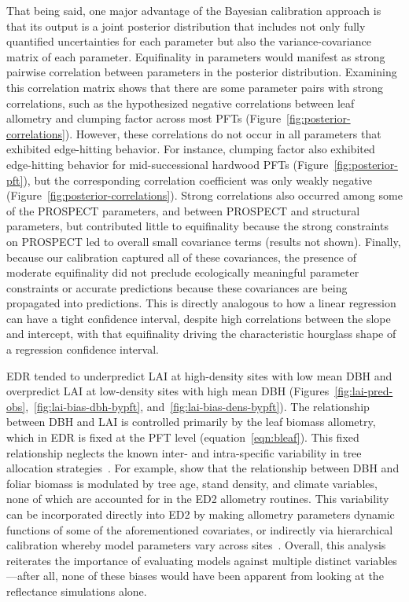 That being said, one major advantage of the Bayesian calibration approach is that its output is a joint posterior distribution that includes not only fully quantified uncertainties for each parameter but also the variance-covariance matrix of each parameter.
Equifinality in parameters would manifest as strong pairwise correlation between parameters in the posterior distribution.
Examining this correlation matrix shows that there are some parameter pairs with strong correlations, such as the hypothesized negative correlations between leaf allometry and clumping factor across most PFTs (Figure~\ref{fig:posterior-correlations}).
However, these correlations do not occur in all parameters that exhibited edge-hitting behavior.
For instance, clumping factor also exhibited edge-hitting behavior for mid-successional hardwood PFTs (Figure~\ref{fig:posterior-pft}), but the corresponding correlation coefficient was only weakly negative (Figure~\ref{fig:posterior-correlations}).
Strong correlations also occurred among some of the PROSPECT parameters, and between PROSPECT and structural parameters, but contributed little to equifinality because the strong constraints on PROSPECT led to overall small covariance terms (results not shown).
Finally, because our calibration captured all of these covariances, the presence of moderate equifinality did not preclude ecologically meaningful parameter constraints or accurate predictions because these covariances are being propagated into predictions.
This is directly analogous to how a linear regression can have a tight confidence interval, despite high correlations between the slope and intercept, with that equifinality driving the characteristic hourglass shape of a regression confidence interval.

EDR tended to underpredict LAI at high-density sites with low mean DBH and overpredict LAI at low-density sites with high mean DBH (Figures~\ref{fig:lai-pred-obs},~\ref{fig:lai-bias-dbh-bypft}, and~\ref{fig:lai-bias-dens-bypft}).
The relationship between DBH and LAI is controlled primarily by the leaf biomass allometry, which in EDR is fixed at the PFT level (equation~\ref{eqn:bleaf}).
This fixed relationship neglects the known inter- and intra-specific variability in tree allocation strategies~\citep{forrester2017generalized, dolezal2020contrasting}.
For example, \citet{forrester2017generalized} show that the relationship between DBH and foliar biomass is modulated by tree age, stand density, and climate variables, none of which are accounted for in the ED2 allometry routines.
This variability can be incorporated directly into ED2 by making allometry parameters dynamic functions of some of the aforementioned covariates,
or indirectly via hierarchical calibration whereby model parameters vary across sites~\citep{dietze2008capturing}.
Overall, this analysis reiterates the importance of evaluating models against multiple distinct variables---after all, none of these biases would have been apparent from looking at the reflectance simulations alone.

